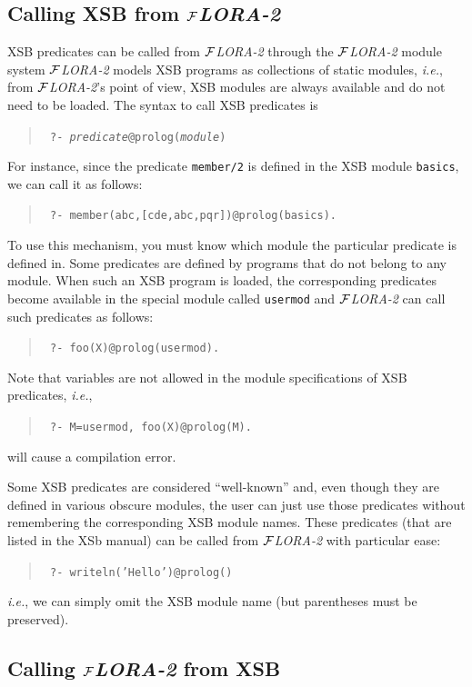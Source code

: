 \documentclass[11pt]{article}
\newcommand{\FLORA}{{\mbox{${\cal F}${\small\it LORA}\rm\emph{-2}}}\xspace}
\begin{document}
\subsection{Calling XSB from \FLORA}

XSB predicates can be called from \FLORA through the \FLORA module system
\FLORA models XSB programs as collections of static modules, {\it i.e.},
from \FLORA's point of view, XSB modules are always available
and do not need to be loaded. The syntax to call XSB predicates is
\begin{quote}
  \tt
  ?- {\it predicate}@prolog({\it module})  
\end{quote}
For instance, since the predicate {\tt member/2} is defined in the XSB
module {\tt basics}, we can call it as follows:
\begin{quote}
 \tt
 ?- member(abc,[cde,abc,pqr])@prolog(basics).
\end{quote}
To use this mechanism, you must know which module the particular predicate
is defined in. Some predicates are defined by programs that do not belong
to any module. When such an XSB program is loaded, the corresponding
predicates become available in the special module called {\tt usermod} and
\FLORA can call such predicates as follows:
\begin{quote}
 \tt
 ?- foo(X)@prolog(usermod).
\end{quote}
Note that variables are not allowed in the module specifications of XSB
predicates, {\it i.e.},
\begin{quote}
 \tt
 ?- M=usermod, foo(X)@prolog(M).
\end{quote}
will cause a compilation error.

Some XSB predicates are considered ``well-known'' and, even though they are
defined in various obscure modules, the user can just use those predicates
without remembering the corresponding XSB module names. These predicates
(that are listed in the XSb manual) can be called from \FLORA with
particular ease:
\begin{quote}
 \tt
 ?- writeln('Hello')@prolog()
\end{quote}
{\it i.e.}, we can simply omit the XSB module name (but parentheses must be
preserved). 




\subsection{Calling \FLORA from XSB}
\end{document}
